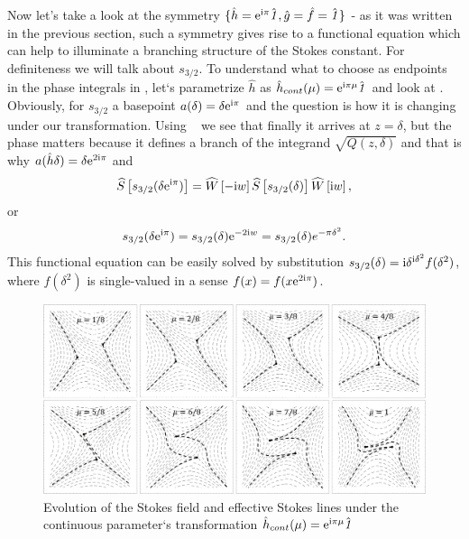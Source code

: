 \documentclass[12pt]{iopart}
\def\S{\widehat{S}}
\def\W{\widehat{W}}
\def\f{\hat{f}}
\def\g{\hat{g}}
\def\h{\hat{h}}
\def\unity{\hat{\it 1}}
\begin{document}
Now let's take a look at the symmetry $\{\h=\rme^{\rmi\pi}\unity,\g=\f=\unity\}$ - as it was written in the previous section, such a symmetry gives rise to a functional equation which can help to illuminate a branching structure of the Stokes constant. 
For definiteness we will talk about $s_{3/2}$. To understand what to choose as endpoints in the phase integrals in , let`s parametrize $\h$ as $\h_{cont}(\mu)=\rme^{\rmi\pi\mu}\unity$ and look at . Obviously, for $s_{3/2}$ a basepoint $a(\delta)=\delta \mathrm{e}^{\mathrm{i}\pi}$ and the question is how it is changing under our transformation. Using ~ we see that finally it arrives at $z=\delta$, but the phase matters because it defines a branch of the integrand $\sqrt{Q(z,\delta)}$ and that is why 
$a(\h\delta)=\delta \rme^{2\rmi\pi}$ and
\begin{eqnarray}
\S \left[ s_{3/2}(\delta \rme^{\rmi\pi}) \right] = 
\W \left[-\rmi w \right]
\S \left[ s_{3/2} (\delta) \right]
\W \left[ \rmi w \right],
\end{eqnarray}
or
\begin{eqnarray}
s_{3/2}(\delta \mathrm{e}^{\mathrm{i}\pi})=s_{3/2}(\delta)\mathrm{e}^{-2\mathrm{i} w}=s_{3/2}(\delta)e^{-\pi\delta^2}.
\label{eq:websym_3}
\end{eqnarray}
This functional equation can be easily solved by substitution 
$s_{3/2}(\delta)=\mathrm{i}\delta^{\mathrm{i}\delta^2}f(\delta^2)$, where $f(\delta^2)$
is single-valued in a sense $f(x)=f(x \mathrm{e}^{2\mathrm{i}\pi})$.

\begin{figure}
\centering
\noindent
\includegraphics[scale=.5]{stuff/wrs.png}
\caption{Evolution of the Stokes field and effective Stokes lines 
under the continuous parameter`s transformation $\h_{cont}(\mu)=\rme^{\rmi\pi\mu}\unity$}
\label{fig:webrs}
\end{figure} 
\end{document}

